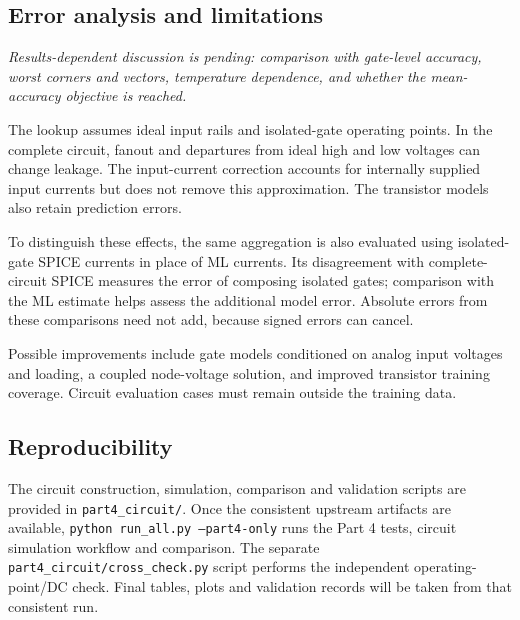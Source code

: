 \subsection{Error analysis and limitations}
\noindent\textit{Results-dependent discussion is pending: comparison with
gate-level accuracy, worst corners and vectors, temperature dependence,
and whether the mean-accuracy objective is reached.}

The lookup assumes ideal input rails and isolated-gate operating points.
In the complete circuit, fanout and departures from ideal high and low
voltages can change leakage. The input-current correction accounts for
internally supplied input currents but does not remove this approximation.
The transistor models also retain prediction errors.

To distinguish these effects, the same aggregation is also evaluated using
isolated-gate SPICE currents in place of ML currents. Its disagreement with
complete-circuit SPICE measures the error of composing isolated gates;
comparison with the ML estimate helps assess the additional model error.
Absolute errors from these comparisons need not add, because signed errors
can cancel.

Possible improvements include gate models conditioned on analog input
voltages and loading, a coupled node-voltage solution, and improved
transistor training coverage. Circuit evaluation cases must remain outside
the training data.

\subsection{Reproducibility}
The circuit construction, simulation, comparison and validation scripts
are provided in \texttt{part4\_circuit/}. Once the consistent upstream
artifacts are available, \texttt{python run\_all.py --part4-only} runs the
Part 4 tests, circuit simulation workflow and comparison. The separate
\texttt{part4\_circuit/cross\_check.py} script performs the independent
operating-point/DC check. Final tables, plots and validation records will
be taken from that consistent run.
